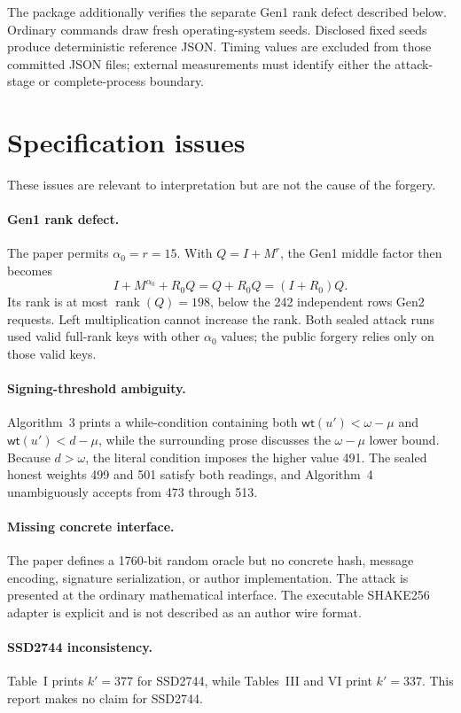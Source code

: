 \documentclass[10pt,a4paper]{article}
\newcommand{\wt}{\mathsf{wt}}
\begin{document}
The package additionally verifies the separate Gen1 rank defect described
below. Ordinary commands draw fresh operating-system seeds. Disclosed fixed
seeds produce deterministic reference JSON. Timing values are excluded from
those committed JSON files; external measurements must identify either the
attack-stage or complete-process boundary.

\section{Specification issues}

These issues are relevant to interpretation but are not the cause of the
forgery.

\paragraph{Gen1 rank defect.}
The paper permits $\alpha_0=r=15$. With $Q=I+M^r$, the Gen1 middle factor then
becomes
\[
 I+M^{\alpha_0}+R_0Q=Q+R_0Q=(I+R_0)Q.
\]
Its rank is at most $\operatorname{rank}(Q)=198$, below the 242 independent
rows Gen2 requests. Left multiplication cannot increase the rank. Both sealed
attack runs used valid full-rank keys with other $\alpha_0$ values; the public
forgery relies only on those valid keys.

\paragraph{Signing-threshold ambiguity.}
Algorithm~3 prints a while-condition containing both
$\wt(u')<\omega-\mu$ and $\wt(u')<d-\mu$, while the surrounding prose
discusses the $\omega-\mu$ lower bound. Because $d>\omega$, the literal
condition imposes the higher value 491. The sealed honest weights 499 and 501
satisfy both readings, and Algorithm~4 unambiguously accepts from 473 through
513.

\paragraph{Missing concrete interface.}
The paper defines a 1760-bit random oracle but no concrete hash, message
encoding, signature serialization, or author implementation. The attack is
presented at the ordinary mathematical interface. The executable SHAKE256
adapter is explicit and is not described as an author wire format.

\paragraph{SSD2744 inconsistency.}
Table~I prints $k'=377$ for SSD2744, while Tables~III and VI print $k'=337$.
This report makes no claim for SSD2744.
\end{document}
